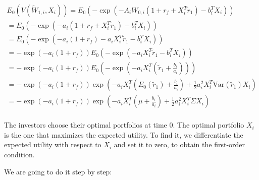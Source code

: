 \begin{equation}
    \begin{aligned}
    E_0(V(\tilde{W}_{1,i}, X_i)) = E_0(-\exp{(-A_i W_{0,i}(1 + r_f + X_i^T \tilde{r}_1)-b_i^T X_i)}) \\
    = E_0(-\exp{(-a_i(1 + r_f + X_i^T \tilde{r}_1)-b_i^T X_i)})  \\
    = E_0(-\exp{(-a_i(1 + r_f) - a_i X_i^T \tilde{r}_1 - b_i^T X_i)}) \\
    = -\exp{(-a_i(1 + r_f))} E_0(-\exp{(-a_i X_i^T \tilde{r}_1 - b_i^T X_i)}) \\
    = -\exp{(-a_i(1 + r_f))} E_0(-\exp{(-a_i X_i^T (\tilde{r}_1 + \frac{b_i}{a_i}))})  \\
    = -\exp{(-a_i (1 + r_f))} \exp{(-a_i X_i^T (E_0(\tilde{r}_1) + \frac{b_i}{a_i})+\frac{1}{2}a_i^2 X_i^T \text{Var}(\tilde{r}_1)X_i)} \\
    = -\exp{(-a_i (1 + r_f))} \exp{(-a_i X_i^T (\mu + \frac{b_i}{a_i})+\frac{1}{2}a_i^2 X_i^T \Sigma X_i)} \\
    \end{aligned}
\end{equation}

The investors choose their optimal portfolios at time 0. 
The optimal portfolio $X_i$ is the one that maximizes the expected utility.
To find it, we differentiate the expected utility with respect to $X_i$ and 
set it to zero, to obtain the first-order condition.

We are going to do it step by step:

